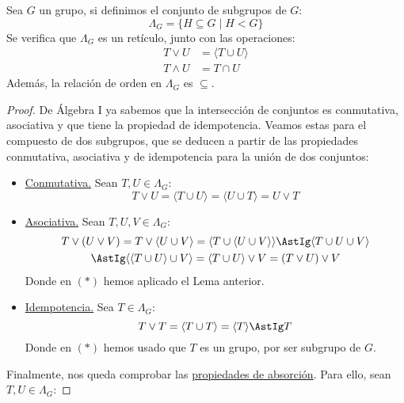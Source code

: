\begin{prop}
    Sea $G$ un grupo, si definimos el conjunto de subgrupos de $G$:
    \begin{equation*}
        \Lambda_G = \{H \subseteq G \mid H < G\}
    \end{equation*}
    Se verifica que $\Lambda_G$ es un retículo, junto con las operaciones:
    \begin{align*}
        T \lor U &= \langle T\cup U \rangle  \\
        T \land U &= T\cap U
    \end{align*}
    Además, la relación de orden en $\Lambda_G$ es $\subseteq $.
    \begin{proof}
        De Álgebra I ya sabemos que la intersección de conjuntos es conmutativa, asociativa y que tiene la propiedad de idempotencia. Veamos estas para el compuesto de dos subgrupos, que se deducen a partir de las propiedades conmutativa, asociativa y de idempotencia para la unión de dos conjuntos:
        \begin{itemize}
            \item \underline{Conmutativa.} Sean $T,U\in \Lambda_G$:
                \begin{equation*}
                    T\lor U = \langle T\cup U \rangle  = \langle U\cup T \rangle  = U\lor T
                \end{equation*}
            \item \underline{Asociativa.} Sean $T,U,V \in \Lambda_G$:
                \begin{multline*}
                    T\lor(U\lor V) = T\lor \langle U\cup V \rangle  = \langle T\cup \langle U\cup V \rangle  \rangle  \AstIg \langle T\cup U\cup V \rangle  \\ \AstIg \langle \langle T\cup U \rangle \cup V \rangle  = \langle T\cup U \rangle \lor V = (T\lor U)\lor V
                \end{multline*}
                Donde en $(\ast)$ hemos aplicado el Lema anterior.
            \item \underline{Idempotencia.} Sea $T\in \Lambda_G$:
                \begin{equation*}
                    T\lor T = \langle T\cup T \rangle  = \langle T \rangle  \AstIg T
                \end{equation*}
                Donde en $(\ast)$ hemos usado que $T$ es un grupo, por ser subgrupo de $G$.
        \end{itemize}
        Finalmente, nos queda comprobar las \underline{propiedades de absorción}. Para ello, sean $T,U\in \Lambda_G$:

\end{proof}
\end{prop}
